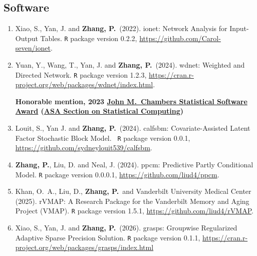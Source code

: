 \documentclass[12pt,letterpaper]{article}
\newcommand{\PZnot}{\textbf{Zhang, P.}}
\newcommand{\pubnote}[1]{%
  \par\nobreak\addvspace{4pt}\nobreak%
  {\normalsize\bfseries\color{purple}%
   \hypersetup{urlcolor=cvnoteblue}#1\par}%
  \nobreak\addvspace{5pt}%
}
\newenvironment{cventry}{\begin{minipage}[t]{\linewidth}}{\end{minipage}}
\begin{document}
	\subsection*{Software}
	\begin{enumerate}
		\item\begin{cventry}{Xiao, S., Yan, J.} and \PZnot\ (2022).
		ionet: Network Analysis for Input-Output Tables. {\tt R} 
		package version 0.2.2, 
		\url{https://github.com/Carol-seven/ionet}.
		\par\end{cventry}
		\item\begin{cventry} {Yuan, Y., Wang, T., Yan, J.} and \PZnot\ (2024). 
		wdnet: Weighted and Directed Network. {\tt R} package 
		version 1.2.3, 
		\url{https://cran.r-project.org/web/packages/wdnet/index.html}.
		\pubnote{Honorable mention, 2023 
		\href{https://community.amstat.org/jointscsg-section/awards/john-m-chambers}{John
		 M.\ Chambers Statistical Software Award} 
		(\href{https://community.amstat.org/jointscsg-section/home}{ASA
		 Section on Statistical Computing})}
		\par\end{cventry}
	  	\item\begin{cventry}{Louit, S., Yan J.} and \PZnot\ (2024). calfsbm: 
	  	Covariate-Assisted Latent Factor Stochastic Block Model. {\tt 
	  	R} package version 0.0.1,  
	  	\url{https://github.com/sydneylouit539/calfsbm}.
		\par\end{cventry}
	  	\item\begin{cventry} \PZnot, {Liu, D.} and {Neal, J.} (2024).
	  	ppcm: Predictive Partly Conditional Model. {\tt R} package 
	  	version 0.0.0.1, \url{https://github.com/liud4/ppcm}.
		\par\end{cventry}
	  	\item\begin{cventry} {Khan, O.\, A., Liu, D.}, \PZnot\ and {Vanderbilt University Medical Center} (2025). rVMAP: A 
	  	Research Package for the Vanderbilt Memory and Aging Project 
	  	(VMAP). {\tt R} package version 
	  	1.5.1, \url{https://github.com/liud4/rVMAP}.
		\par\end{cventry}
	  	\item\begin{cventry} {Xiao, S., Yan, J.} and \PZnot\ (2026). grasps: 
	  	Groupwise Regularized Adaptive Sparse Precision Solution. 
	  	{\tt R} package version 0.1.1, 
	  	\url{https://cran.r-project.org/web/packages/grasps/index.html}
		\par\end{cventry}
	\end{enumerate}
	
\end{document}
